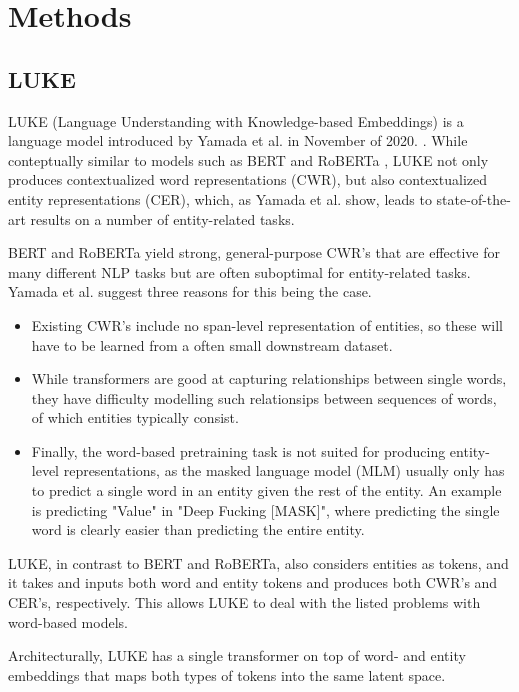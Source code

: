 \documentclass[main.tex]{subfiles}
\begin{document}
\chapter{Methods}

\section{LUKE}
LUKE (Language Understanding with Knowledge-based Embeddings) is a language model introduced by Yamada et al. in November of 2020. \cite{yamada2020luke}.
While conteptually similar to models such as BERT \cite{devlin2019bert} and RoBERTa \cite{liu2019roberta}, LUKE not only produces contextualized word representations (CWR), but also contextualized entity representations (CER), which, as Yamada et al. show, leads to state-of-the-art results on a number of entity-related tasks.

BERT \cite{devlin2019bert} and RoBERTa \cite{liu2019roberta} yield strong, general-purpose CWR's that are effective for many different NLP tasks but are often suboptimal for entity-related tasks.
Yamada et al. suggest three reasons for this being the case.
\begin{itemize}
    \item Existing CWR's include no span-level representation of entities, so these will have to be learned from a often small downstream dataset.
    \item While transformers are good at capturing relationships between single words, they have difficulty modelling such relationsips between sequences of words, of which entities typically consist.
    \item Finally, the word-based pretraining task is not suited for producing entity-level representations, as the masked language model (MLM) usually only has to predict a single word in an entity given the rest of the entity.
    An example is predicting "Value" in "Deep Fucking [MASK]", where predicting the single word is clearly easier than predicting the entire entity.
\end{itemize}
LUKE, in contrast to BERT and RoBERTa, also considers entities as tokens, and it takes and inputs both word and entity tokens and produces both CWR's and CER's, respectively.
This allows LUKE to deal with the listed problems with word-based models.

Architecturally, LUKE has a single transformer on top of word- and entity embeddings that maps both types of tokens into the same latent space.
\end{document}
